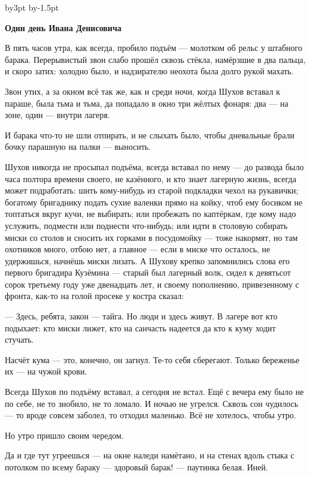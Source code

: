 
\advance\hsize by3pt
\advance\pdfhorigin by-1.5pt

\centerline{\bf Один день Ивана Денисовича}

\bigskip

В пять часов утра, как всегда, пробило подъём --- молотком об рельс у штабного барака. 
Перерывистый звон слабо прошёл сквозь стёкла, намёрзшие в два пальца, и скоро затих: холодно 
было, и надзирателю неохота была долго рукой махать.

Звон утих, а за окном всё так же, как и среди ночи, когда Шухов вставал к параше, была тьма и 
тьма, да попадало в окно три жёлтых фонаря: два --- на зоне, один --- внутри лагеря.

И барака что-то не шли отпирать, и не слыхать было, чтобы дневальные брали бочку парашную на 
палки --- выносить.

Шухов никогда не просыпал подъёма, всегда вставал по нему --- до развода было часа полтора 
времени своего, не казённого, и кто знает лагерную жизнь, всегда может подработать: шить 
кому-нибудь из старой подкладки чехол на рукавички; богатому бригаднику подать сухие 
валенки прямо на койку, чтоб ему босиком не топтаться вкруг кучи, не выбирать; или пробежать 
по каптёркам, где кому надо услужить, подмести или поднести что-нибудь; или идти в столовую 
собирать миски со столов и сносить их горками в посудомойку --- тоже накормят, но там 
охотников много, отбою нет, а главное --- если в миске что осталось, не удержишься, начнёшь 
миски лизать. А Шухову крепко запомнились слова его первого бригадира Кузёмина --- старый был 
лагерный волк, сидел к девятьсот сорок третьему году уже двенадцать лет, и своему 
пополнению, привезенному с фронта, как-то на голой просеке у костра сказал:

--- Здесь, ребята, закон --- тайга. Но люди и здесь живут. В лагере вот кто подыхает: кто миски 
лижет, кто на санчасть надеется да кто к куму ходит стучать.

Насчёт кума --- это, конечно, он загнул. Те-то себя сберегают. Только береженье их --- на чужой 
крови.

Всегда Шухов по подъёму вставал, а сегодня не встал. Ещё с вечера ему было не по себе, не то 
знобило, не то ломало. И ночью не угрелся. Сквозь сон чудилось --- то вроде совсем заболел, то 
отходил маленько. Всё не хотелось, чтобы утро.

Но утро пришло своим чередом.

Да и где тут угреешься --- на окне наледи намётано, и на стенах вдоль стыка с потолком по всему 
бараку --- здоровый барак! --- паутинка белая. Иней.

